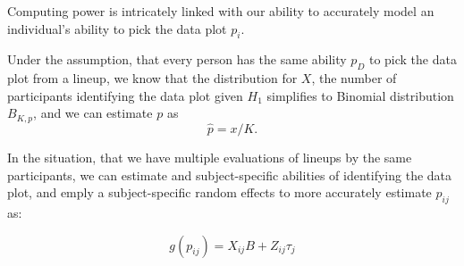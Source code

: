 \documentclass[11pt]{article}
\begin{document}
Computing power  is intricately linked with our ability to accurately model an individual's ability to pick the data plot $p_i$.

Under the assumption, that every person has the same ability $p_D$ to pick the data plot from a lineup, we know that the distribution for $X$, the number of participants identifying the data plot given $H_1$  simplifies to  Binomial distribution $B_{K, p}$, and we can estimate $p$ as
\[
\hat{p} = x/K.
\] 


In the situation, that we have multiple evaluations of lineups by the same participants, we can estimate and subject-specific abilities of identifying the data plot, and emply a subject-specific random effects to more accurately estimate $p_{ij}$ as: 

\begin{equation}
g(p_{ij}) = X_{ij}B  + Z_{ij} \tau_j 
\label{mixed} 
\end{equation}
%
\end{document}

